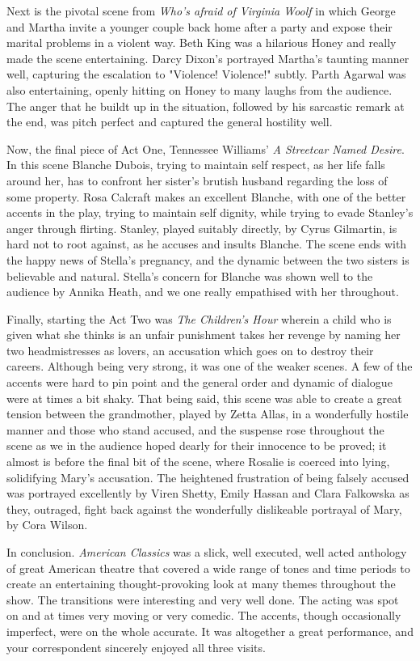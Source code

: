 \documentclass[11pt,a4paper]{report}
\begin{document}
\begin{multicols}{2}
Next is the pivotal scene from \textit{Who's afraid of Virginia Woolf} in
which George and Martha invite a younger couple back home after a party
and expose their marital problems in a violent way. Beth King was a
hilarious Honey and really made the scene entertaining. Darcy Dixon's
portrayed Martha's taunting manner well, capturing the escalation to
"Violence! Violence!" subtly. Parth Agarwal was also entertaining,
openly hitting on Honey to many laughs from the audience. The anger that
he buildt up in the situation, followed by his sarcastic remark at the
end, was pitch perfect and captured the general hostility well.

Now, the final piece of Act One, Tennessee Williams' \textit{A Streetcar
	Named Desire}. In this scene Blanche Dubois, trying to maintain self
respect, as her life falls around her, has to confront her sister's
brutish husband regarding the loss of some property. Rosa Calcraft makes
an excellent Blanche, with one of the better accents in the play, trying
to maintain self dignity, while trying to evade Stanley's anger through
flirting. Stanley, played suitably directly, by Cyrus Gilmartin, is hard
not to root against, as he accuses and insults Blanche. The scene ends
with the happy news of Stella's pregnancy, and the dynamic between the
two sisters is believable and natural. Stella's concern for Blanche was
shown well to the audience by Annika Heath, and we one really empathised
with her throughout.

Finally, starting the Act Two was \textit{The Children's Hour} wherein a
child who is given what she thinks is an unfair punishment takes her
revenge by naming her two headmistresses as lovers, an accusation which
goes on to destroy their careers. Although being very strong, it was one
of the weaker scenes. A few of the accents were hard to pin point and
the general order and dynamic of dialogue were at times a bit shaky.
That being said, this scene was able to create a great tension between
the grandmother, played by Zetta Allas, in a wonderfully hostile manner
and those who stand accused, and the suspense rose throughout the scene
as we in the audience hoped dearly for their innocence to be proved; it
almost is before the final bit of the scene, where Rosalie is coerced
into lying, solidifying Mary's accusation. The heightened frustration of
being falsely accused was portrayed excellently by Viren Shetty, Emily
Hassan and Clara Falkowska as they, outraged, fight back against the
wonderfully dislikeable portrayal of Mary, by Cora Wilson.

In conclusion. \textit{American Classics} was a slick, well executed, well
acted anthology of great American theatre that covered a wide range of
tones and time periods to create an entertaining thought-provoking look
at many themes throughout the show. The transitions were interesting and
very well done. The acting was spot on and at times very moving or very
comedic. The accents, though occasionally imperfect, were on the whole
accurate. It was altogether a great performance, and your correspondent
sincerely enjoyed all three visits.

\end{multicols}
\end{document}
